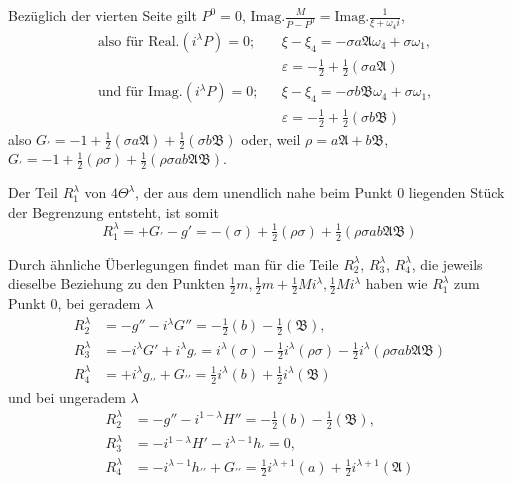 Bezüglich der vierten Seite gilt $P^0=0$, $\mathrm{Imag.}\frac M{P-P^0}=\mathrm{Imag.}\frac1{\xi+\omega_4i}$,
\[
\begin{aligned}
&\text{also für }\mathrm{Real.}(i^\lambda P)=0;&&\xi-\xi_4=-\sigma a\mathfrak A\omega_4+\sigma\omega_1,\\
&&&\varepsilon=-\tfrac12+\tfrac12(\sigma a\mathfrak A)\\
&\text{und für }\mathrm{Imag.}(i^\lambda P)=0;&&\xi-\xi_4=-\sigma b\mathfrak B\omega_4+\sigma\omega_1,\\
&&&\varepsilon=-\tfrac12+\tfrac12(\sigma b\mathfrak B)
\end{aligned}
\]
also $G_{\prime}=-1+\tfrac12(\sigma a\mathfrak A)+\tfrac12(\sigma b\mathfrak B)$ oder, weil $\rho=a\mathfrak A+b\mathfrak B$, $G_{\prime}=-1+\tfrac12(\rho\sigma)+\tfrac12(\rho\sigma ab\mathfrak A\mathfrak B)$.

Der Teil $R_1^\lambda$ von $4\Theta^\lambda$, der aus dem unendlich nahe beim Punkt $0$ liegenden Stück der Begrenzung entsteht, ist somit
\[
R_1^\lambda=+G_{\prime}-g'=-(\sigma)+\tfrac12(\rho\sigma)+\tfrac12(\rho\sigma ab\mathfrak A\mathfrak B)
\]

Durch ähnliche Überlegungen findet man für die Teile $R_2^\lambda$, $R_3^\lambda$, $R_4^\lambda$, die jeweils dieselbe Beziehung zu den Punkten $\tfrac12m,\tfrac12m+\tfrac12Mi^\lambda,\tfrac12Mi^\lambda$ haben wie $R_1^\lambda$ zum Punkt $0$, bei geradem $\lambda$
\[
\begin{aligned}
R_2^\lambda&=-g''-i^\lambda G''=-\tfrac12(b)-\tfrac12(\mathfrak B),\\
R_3^\lambda&=-i^\lambda G'+i^\lambda g_{\prime}=i^\lambda(\sigma)-\tfrac12i^\lambda(\rho\sigma)-\tfrac12i^\lambda(\rho\sigma ab\mathfrak A\mathfrak B)\\
R_4^\lambda&=+i^\lambda g_{\prime\prime}+G_{\prime\prime}=\tfrac12i^\lambda(b)+\tfrac12i^\lambda(\mathfrak B)
\end{aligned}
\]
und bei ungeradem $\lambda$
\[
\begin{aligned}
R_2^\lambda&=-g''-i^{1-\lambda}H''=-\tfrac12(b)-\tfrac12(\mathfrak B),\\
R_3^\lambda&=-i^{1-\lambda}H'-i^{\lambda-1}h_{\prime}=0,\\
R_4^\lambda&=-i^{\lambda-1}h_{\prime\prime}+G_{\prime\prime}=\tfrac12i^{\lambda+1}(a)+\tfrac12i^{\lambda+1}(\mathfrak A)
\end{aligned}
\]

